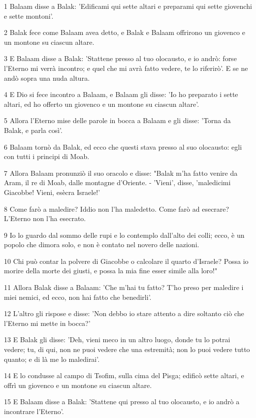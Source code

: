 \par 1 Balaam disse a Balak: 'Edificami qui sette altari e preparami qui sette giovenchi e sette montoni'.
\par 2 Balak fece come Balaam avea detto, e Balak e Balaam offrirono un giovenco e un montone su ciascun altare.
\par 3 E Balaam disse a Balak: 'Stattene presso al tuo olocausto, e io andrò: forse l'Eterno mi verrà incontro; e quel che mi avrà fatto vedere, te lo riferirò'. E se ne andò sopra una nuda altura.
\par 4 E Dio si fece incontro a Balaam, e Balaam gli disse: 'Io ho preparato i sette altari, ed ho offerto un giovenco e un montone su ciascun altare'.
\par 5 Allora l'Eterno mise delle parole in bocca a Balaam e gli disse: 'Torna da Balak, e parla così'.
\par 6 Balaam tornò da Balak, ed ecco che questi stava presso al suo olocausto: egli con tutti i principi di Moab.
\par 7 Allora Balaam pronunziò il suo oracolo e disse: "Balak m'ha fatto venire da Aram, il re di Moab, dalle montagne d'Oriente. - 'Vieni', disse, 'maledicimi Giacobbe! Vieni, esècra Israele!'
\par 8 Come farò a maledire? Iddio non l'ha maledetto. Come farò ad esecrare? L'Eterno non l'ha esecrato.
\par 9 Io lo guardo dal sommo delle rupi e lo contemplo dall'alto dei colli; ecco, è un popolo che dimora solo, e non è contato nel novero delle nazioni.
\par 10 Chi può contar la polvere di Giacobbe o calcolare il quarto d'Israele? Possa io morire della morte dei giusti, e possa la mia fine esser simile alla loro!"
\par 11 Allora Balak disse a Balaam: 'Che m'hai tu fatto? T'ho preso per maledire i miei nemici, ed ecco, non hai fatto che benedirli'.
\par 12 L'altro gli rispose e disse: 'Non debbo io stare attento a dire soltanto ciò che l'Eterno mi mette in bocca?'
\par 13 E Balak gli disse: 'Deh, vieni meco in un altro luogo, donde tu lo potrai vedere; tu, di qui, non ne puoi vedere che una estremità; non lo puoi vedere tutto quanto; e di là me lo maledirai'.
\par 14 E lo condusse al campo di Tsofim, sulla cima del Pisga; edificò sette altari, e offrì un giovenco e un montone su ciascun altare.
\par 15 E Balaam disse a Balak: 'Stattene qui presso al tuo olocausto, e io andrò a incontrare l'Eterno'.
